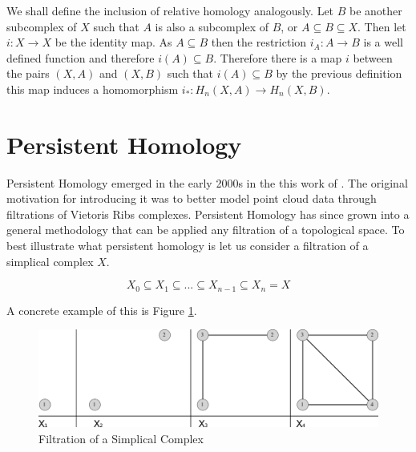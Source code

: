 We shall define the inclusion of relative homology analogously. Let $B$ be another subcomplex of $X$ such that $A$ is also a subcomplex of $B$, or $A \subseteq B \subseteq X$. Then let $i : X \to X$ be the identity map. As $A \subseteq B$ then the restriction $i_A: A \to B$ is a well defined function and therefore $i(A) \subseteq B$. Therefore there is a map $i$ between the pairs $(X, A)$ and $(X, B)$ such that $i(A) \subseteq B$ by the previous definition this map induces a homomorphism $i_* : H_n(X, A) \to H_n(X, B)$.



\section{Persistent Homology}


Persistent Homology emerged in the early 2000s in the this work of \cite{persistence-original}. The original motivation for introducing it was to better model point cloud data through filtrations of Vietoris Ribs complexes. Persistent Homology has since grown into a general methodology that can be applied any filtration of a topological space. To best illustrate what persistent homology is let us consider a filtration of a simplical complex $X$. 

$$ X_0 \subseteq X_1 \subseteq ... \subseteq X_{n-1} \subseteq X_n = X$$

A concrete example of this is Figure \ref{fig:filt-sc}.


\begin{figure}[h]%
    \centering
    \includegraphics[scale=0.3]{./images/chapter4/filt-combined.eps}%
    \caption{Filtration of a Simplical Complex}%
    \label{fig:filt-sc}%
\end{figure}

